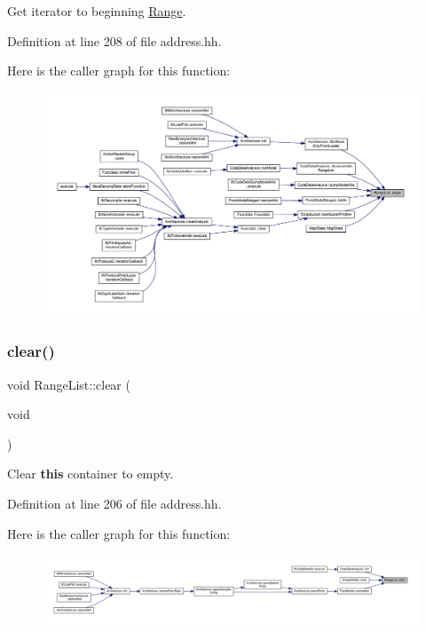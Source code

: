 Get iterator to beginning \mbox{\hyperlink{class_range}{Range}}. 



Definition at line 208 of file address.\+hh.

Here is the caller graph for this function\+:
\nopagebreak
\begin{figure}[H]
\begin{center}
\leavevmode
\includegraphics[width=350pt]{class_range_list_a890040e91f6bf573706b76a185ab6cbe_icgraph}
\end{center}
\end{figure}
\mbox{\label{class_range_list_afab3e451530bb1f7c8c1bd66a7df32a5}} 
\subsubsection{\texorpdfstring{clear()}{clear()}}
{\footnotesize\ttfamily void Range\+List\+::clear (\begin{DoxyParamCaption}\item[{void}]{ }\end{DoxyParamCaption})\hspace{0.3cm}{\ttfamily [inline]}}



Clear {\bfseries{this}} container to empty. 



Definition at line 206 of file address.\+hh.

Here is the caller graph for this function\+:
\nopagebreak
\begin{figure}[H]
\begin{center}
\leavevmode
\includegraphics[width=350pt]{class_range_list_afab3e451530bb1f7c8c1bd66a7df32a5_icgraph}
\end{center}
\end{figure}
\mbox{\label{class_range_list_ad78a4eba9787c374803f2503fdd38f3c}} 
